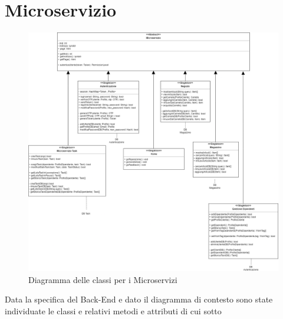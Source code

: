 \documentclass{report}
\begin{document}
\section{Microservizio}
\begin{figure}[H]
	\centering\includegraphics[width=1\textwidth]{images/Diagramma_delle_classi_Microservizio.png}
	Diagramma delle classi per i Microservizi
\end{figure}
Data la specifica del Back-End e dato il diagramma di contesto sono state individuate le classi e relativi metodi e attributi di cui sotto
\end{document}
